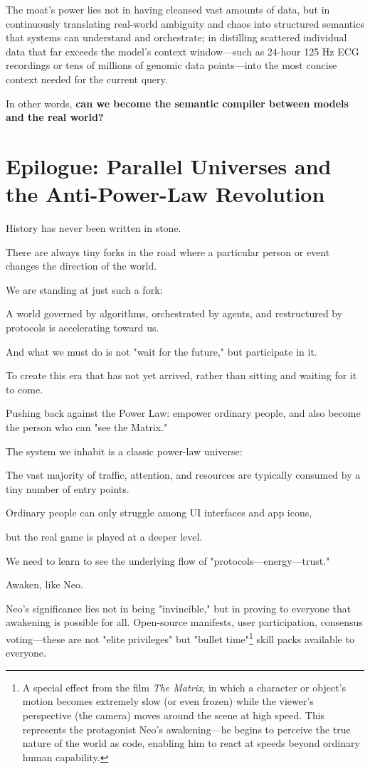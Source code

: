 The moat's power lies not in having cleansed vast amounts of data, but in continuously translating real-world ambiguity and chaos into structured semantics that systems can understand and orchestrate; in distilling scattered individual data that far exceeds the model's context window---such as 24-hour 125 Hz ECG recordings or tens of millions of genomic data points---into the most concise context needed for the current query.

In other words, \textbf{can we become the semantic compiler between models and the real world?}

\section{Epilogue: Parallel Universes and the Anti-Power-Law Revolution}
History has never been written in stone.

There are always tiny forks in the road where a particular person or event changes the direction of the world.

We are standing at just such a fork:

A world governed by algorithms, orchestrated by agents, and restructured by protocols is accelerating toward us.

And what we must do is not "wait for the future," but participate in it.

To create this era that has not yet arrived, rather than sitting and waiting for it to come.

\vspace{1em}

Pushing back against the Power Law: empower ordinary people, and also become the person who can "see the Matrix."

The system we inhabit is a classic power-law universe:

The vast majority of traffic, attention, and resources are typically consumed by a tiny number of entry points.

Ordinary people can only struggle among UI interfaces and app icons,

but the real game is played at a deeper level.

We need to learn to see the underlying flow of "protocols---energy---trust."

\begin{myquote}
Awaken, like Neo.
\end{myquote}

Neo's significance lies not in being "invincible," but in proving to everyone that awakening is possible for all.
Open-source manifests, user participation, consensus voting---these are not "elite privileges" but "bullet time"\footnote{A special effect from the film \textit{The Matrix}, in which a character or object's motion becomes extremely slow (or even frozen) while the viewer's perspective (the camera) moves around the scene at high speed. This represents the protagonist Neo's awakening---he begins to perceive the true nature of the world as code, enabling him to react at speeds beyond ordinary human capability.} skill packs available to everyone.

